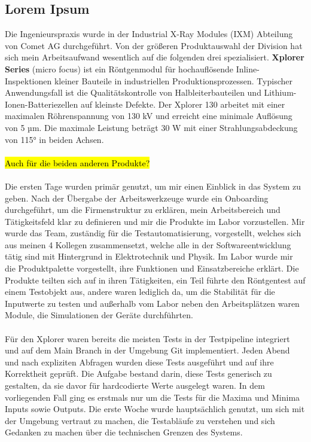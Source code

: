 \documentclass[12pt]{article} %
\begin{document}
\subsection{Lorem Ipsum}
Die Ingenieurspraxis wurde in der Industrial X-Ray Modules (IXM) Abteilung von Comet AG durchgeführt. Von der größeren Produktauswahl der Division hat sich mein Arbeitsaufwand wesentlich auf die folgenden drei spezialisiert.
\textbf{Xplorer Series} (micro focus) ist ein Röntgenmodul für hochauflösende Inline-Inspektionen kleiner Bauteile in industriellen Produktionsprozessen. Typischer Anwendungsfall ist die Qualitätskontrolle von Halbleiterbauteilen und Lithium-Ionen-Batteriezellen auf kleinste Defekte.
Der Xplorer 130 arbeitet mit einer maximalen Röhrenspannung von 130 kV und erreicht eine minimale Auflösung von 5 µm. Die maximale Leistung beträgt 30 W mit einer Strahlungsabdeckung von 115° in beiden Achsen.
\\
\\
\hl{Auch für die beiden anderen Produkte?}
\\
\\
Die ersten Tage wurden primär genutzt, um mir einen Einblick in das System zu geben. Nach der Übergabe der Arbeitswerkzeuge wurde ein Onboarding durchgeführt, um die Firmenstruktur zu erklären, mein Arbeitsbereich und Tätigkeitsfeld klar zu definieren und mir die Produkte im Labor vorzustellen. 
Mir wurde das Team, zuständig für die Testautomatisierung, vorgestellt, welches sich aus meinen 4 Kollegen zusammensetzt, welche alle in der Softwareentwicklung tätig sind mit Hintergrund in Elektrotechnik und Physik.
Im Labor wurde mir die Produktpalette vorgestellt, ihre Funktionen und Einsatzbereiche erklärt. Die Produkte teilten sich auf in ihren Tätigkeiten, ein Teil führte den Röntgentest auf einem Testobjekt aus, andere waren lediglich da, um die Stabilität für die Inputwerte zu testen und außerhalb vom Labor neben den Arbeitsplätzen waren Module, die Simulationen der Geräte durchführten. 
\\
\\
Für den Xplorer waren bereits die meisten Tests in der Testpipeline integriert und auf dem Main Branch in der Umgebung Git implementiert. Jeden Abend und nach expliziten Abfragen wurden diese Tests ausgeführt und auf ihre Korrektheit geprüft.
Die Aufgabe bestand darin, diese Tests generisch zu gestalten, da sie davor für hardcodierte Werte ausgelegt waren. In dem vorliegenden Fall ging es erstmals nur um die Tests für die Maxima und Minima Inputs sowie Outputs. Die erste Woche wurde hauptsächlich genutzt, um sich mit der Umgebung vertraut zu machen, die Testabläufe zu verstehen und sich Gedanken zu machen über die technischen Grenzen des Systems.
\end{document}
